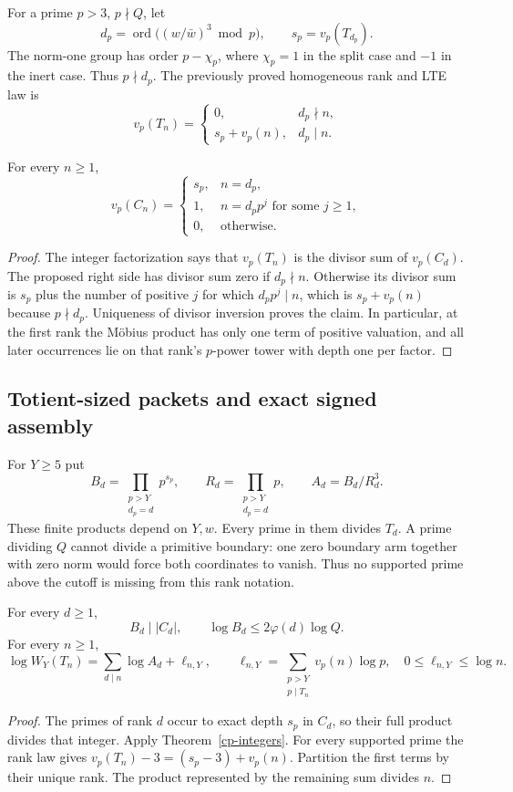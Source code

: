 For a prime $p>3$, $p\nmid Q$, let
\[
 d_p=\operatorname{ord}\bigl((w/\bar w)^3\bmod p\bigr),
 \qquad s_p=v_p(T_{d_p}).
\]
The norm-one group has order $p-\chi_p$, where $\chi_p=1$ in the
split case and $-1$ in the inert case. Thus $p\nmid d_p$.
The previously proved homogeneous rank and LTE law is
\[
 v_p(T_n)=\begin{cases}
 0,&d_p\nmid n,\\
 s_p+v_p(n),&d_p\mid n.
 \end{cases}
\]

\begin{theorem}
\label{cp-valuations}
For every $n\ge1$,
\[
 v_p(C_n)=\begin{cases}
 s_p,&n=d_p,\\
 1,&n=d_pp^j\text{ for some }j\ge1,\\
 0,&\text{otherwise}.
 \end{cases}
\]
\end{theorem}
\begin{proof}
The integer factorization says that $v_p(T_n)$ is the divisor sum
of $v_p(C_d)$. The proposed right side has divisor sum zero if
$d_p\nmid n$. Otherwise its divisor sum is $s_p$ plus the number
of positive $j$ for which $d_pp^j\mid n$, which is $s_p+v_p(n)$
because $p\nmid d_p$. Uniqueness of divisor inversion proves the
claim. In particular, at the first rank the M\"obius product has
only one term of positive valuation, and all later occurrences lie
on that rank's $p$-power tower with depth one per factor.
\end{proof}

\subsection{Totient-sized packets and exact signed assembly}
For $Y\ge5$ put
\[
 B_d=\prod_{\substack{p>Y\\d_p=d}}p^{s_p},\qquad
 R_d=\prod_{\substack{p>Y\\d_p=d}}p,\qquad A_d=B_d/R_d^3.
\]
These finite products depend on $Y,w$. Every prime in them divides
$T_d$. A prime dividing $Q$ cannot divide a primitive boundary:
one zero boundary arm together with zero norm would force both
coordinates to vanish. Thus no supported prime above the cutoff
is missing from this rank notation.

\begin{theorem}
\label{cp-packets}
For every $d\ge1$,
\[
 B_d\mid |C_d|,\qquad \log B_d\le2\varphi(d)\log Q.
\]
For every $n\ge1$,
\[
 \log W_Y(T_n)=\sum_{d\mid n}\log A_d+\ell_{n,Y},
 \qquad
 \ell_{n,Y}=\sum_{\substack{p>Y\\p\mid T_n}}v_p(n)\log p,
 \quad 0\le\ell_{n,Y}\le\log n.
\]
\end{theorem}
\begin{proof}
The primes of rank $d$ occur to exact depth $s_p$ in $C_d$, so their
full product divides that integer. Apply Theorem~\ref{cp-integers}.
For every supported prime the rank law gives
$v_p(T_n)-3=(s_p-3)+v_p(n)$. Partition the first terms by their
unique rank. The product represented by the remaining sum divides $n$.
\end{proof}

